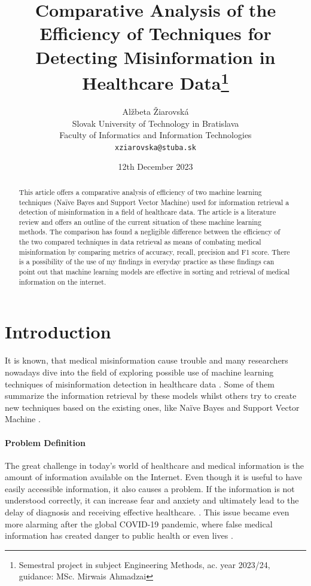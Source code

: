 \documentclass[11pt ,english,a4paper]{article}
\title{Comparative Analysis of the Efficiency of Techniques for Detecting Misinformation in Healthcare Data\thanks{Semestral project in subject Engineering Methods, ac. year 2023/24, guidance: MSc. Mirwais Ahmadzai}}
\author{Alžbeta Žiarovská\\[2pt]
	{\small Slovak University of Technology in Bratislava}\\
	{\small Faculty of Informatics and Information Technologies}\\
	{\small \texttt{xziarovska@stuba.sk}}
	}
\date{\small 12th December 2023}
\begin{document}
\maketitle
\newpage

\begin{abstract}
This article offers a comparative analysis of efficiency of two machine learning techniques (Naïve Bayes and Support Vector Machine) used for information retrieval a detection of misinformation in a field of healthcare data. The article is a literature review and offers an outline of the current situation of these machine learning methods. The comparison has found a negligible difference between the efficiency of the two compared techniques in data retrieval as means of combating medical misinformation by comparing metrics of accuracy, recall, precision and F1 score. There is a possibility of the use of my findings in everyday practice as these findings can point out that machine learning models are effective in sorting and retrieval of medical information on the internet. 
\end{abstract}
\newpage

\section{Introduction}\label{intro}

It is known, that medical misinformation cause trouble \cite{wa19sys} and many researchers nowadays dive into the field of exploring possible use of machine learning techniques of misinformation detection in healthcare data \cite{bar21health}. Some of them summarize the information retrieval by these models whilst others try to create new techniques based on the existing ones, like Naïve Bayes and Support Vector Machine \cite{chap22unmask}.

\paragraph {Problem Definition} The great challenge in today's world of healthcare and medical information is the amount of information available on the Internet. Even though it is useful to have easily accessible information, it also causes a problem. If the information is not understood correctly, it can increase fear and anxiety and ultimately lead to the delay of diagnosis and receiving effective healthcare. \cite{wa19sys}. This issue became even more alarming after the global COVID-19 pandemic, where false medical information has created danger to public health or even lives \cite{war18dr}. 
\end{document}

